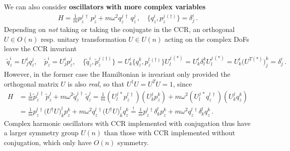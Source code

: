 \documentclass[../QFT_main.tex]{subfiles}
\begin{document}
\begin{mytheorem}
We can also consider \textbf{oscillators with more complex variables}
\begin{align}
    H = \tfrac{1}{m} p_z^{j\,\dagger}\, p_z^j+ m \omega^2 q_z^{j\,\dagger}\,q_z^j\,,\quad \{q^i_z, p_z^{j\, (\dagger)}\} = \delta^i_j\,.
\end{align}
Depending on \emph{not} taking or taking the conjugate in the CCR, an orthogonal $U \in O(n)$ resp. unitary transformation $U \in U(n)$ acting on the complex DoFs leave the CCR invariant
\begin{align}
     \tilde{q}^i_z = U^i_{j} q_z^j, \quad \tilde{p}^i_z = U^i_{j} p_z^j, \quad 
     \{\tilde{q}^i_z, \tilde{p}_z^{j\,(\dagger)}\} = U^i_k \{q_z^k, p_z^{l\,(\dagger)}\} U^{j\,(*)}_l
     = U^i_k \delta^k_l U^{j\,(*)}_l = U^i_k \big(U^{T (*)}\big)^k_j = \delta^i_j\,.
\end{align}
However, in the former case the Hamiltonian is invariant only provided the orthogonal matrix $U$ is also \emph{real}, so that $U^\dagger U=U^TU=1$, since
\begin{align}
    H &= \tfrac{1}{m} \tilde{p}_z^{j\,\dagger}\, \tilde{p}_z^j+ m \omega^2 \tilde{q}_z^{j\,\dagger}\,\tilde{q}_z^j
    = \tfrac{1}{m} (U^{j\,*}_l p_z^{l\,\dagger}) (U^j_k p_z^k) + m \omega^2 (U^{j\,*}_l q_z^{l\,\dagger}) (U^j_k q_z^k) \\
    &= \tfrac{1}{m} p_z^{l\,\dagger} \big(U^{\dagger} U\big)^l_k p_z^k + m \omega^2 q_z^{l\,\dagger} \big(U^{\dagger} U\big)^l_k q_z^k
    \overset{!}{=} \tfrac{1}{m} p_z^{l\,\dagger} \delta^l_k p_z^k + m \omega^2 q_z^{l\,\dagger} \delta^l_k q_z^k\,.
\end{align}
Complex harmonic oscillators with CCR implemented with conjugation thus have a larger symmetry group $U(n)$ than those with CCR implemented without conjugation, which only have $O(n)$ symmetry.


\end{mytheorem}
\end{document}
